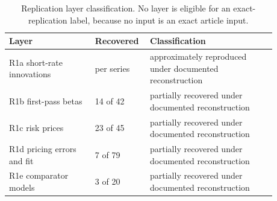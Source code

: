 \begin{table}[htbp]
\centering
\caption{Replication layer classification. No layer is eligible for an
exact-replication label, because no input is an exact article input.}
\label{tab:layers}
\begin{tabular}{p{0.30\linewidth}p{0.14\linewidth}p{0.44\linewidth}}
\toprule
Layer & Recovered & Classification \\
\midrule
R1a short-rate innovations & per series & approximately reproduced under documented reconstruction \\ %
R1b first-pass betas & 14 of 42 & partially recovered under documented reconstruction \\ %
R1c risk prices & 23 of 45 & partially recovered under documented reconstruction \\ %
R1d pricing errors and fit & 7 of 79 & partially recovered under documented reconstruction \\ %
R1e comparator models & 3 of 20 & partially recovered under documented reconstruction \\ %
\bottomrule
\end{tabular}
\end{table}
